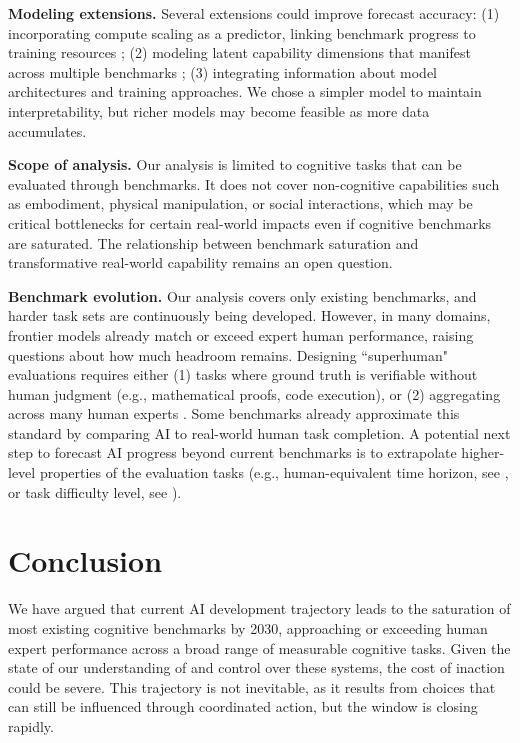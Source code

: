 \documentclass[letterpaper,twocolumn]{article}
\newcommand{\revised}[1]{#1}
\begin{document}
\textbf{Modeling extensions.} Several extensions could improve forecast accuracy: (1) incorporating compute scaling as a predictor, linking benchmark progress to training resources \citep{kaplan_scaling_2020,ruan_observational_2024}; (2) modeling latent capability dimensions that manifest across multiple benchmarks \citep{burnell_revealing_2023, kipnis_metabench_2025, ho_rosetta_2025,polo_sloth_2025,pimpale_forecasting_2025}; (3) integrating information about model architectures and training approaches. We chose a simpler model to maintain interpretability, but richer models may become feasible as more data accumulates.

\revised{\textbf{Scope of analysis.} Our analysis is limited to cognitive tasks that can be evaluated through benchmarks. It does not cover non-cognitive capabilities such as embodiment, physical manipulation, or social interactions, which may be critical bottlenecks for certain real-world impacts even if cognitive benchmarks are saturated. The relationship between benchmark saturation and transformative real-world capability remains an open question.}

\textbf{Benchmark evolution.} Our analysis covers only existing benchmarks, and harder task sets are continuously being developed. However, in many domains, frontier models already match or exceed expert human performance, raising questions about how much headroom remains. Designing ``superhuman" evaluations requires either (1) tasks where ground truth is verifiable without human judgment (e.g., mathematical proofs, code execution), or (2) aggregating across many human experts \citep{phan_humanitys_2025}. Some benchmarks already approximate this standard by comparing AI to real-world human task completion. A potential next step to forecast AI progress beyond current benchmarks is to extrapolate higher-level properties of the evaluation tasks (e.g., human-equivalent time horizon, see \citet{kwa_measuring_2025}, or task difficulty level, see \citet{zhou_general_2025}).

\section{Conclusion}
\label{sec:conclusion}

\revised{We have argued that current AI development trajectory leads to the saturation of most existing cognitive benchmarks by 2030, approaching or exceeding human expert performance across a broad range of measurable cognitive tasks.} Given the state of our understanding of and control over these systems, the cost of inaction could be severe. This trajectory is not inevitable, as it results from choices that can still be influenced through coordinated action, but the window is closing rapidly.
\end{document}
